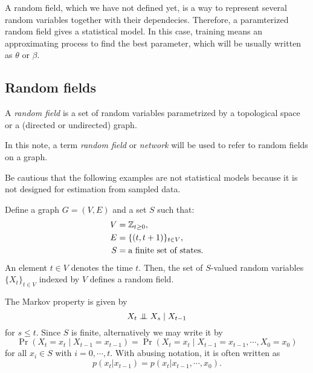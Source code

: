 \documentclass{../exp}
\begin{document}
\begin{ex}
A random field, which we have not defined yet, is a way to represent several random variables together with their dependecies.
Therefore, a paramterized random field gives a statistical model.
In this case, training means an approximating process to find the best parameter, which will be usually written as $\theta$ or $\beta$.
\end{ex}

\subsection{Random fields}
\begin{defn}
A \emph{random field} is a set of random variables parametrized by a topological space or a (directed or undirected) graph.
\end{defn}
\begin{defn}
In this note, a term \emph{random field} or \emph{network} will be used to refer to random fields on a graph.
\end{defn}

Be cautious that the following examples are not statistical models because it is not designed for estimation from sampled data.
\begin{ex}
Define a graph $G=(V,E)$ and a set $S$ such that:
\begin{align*}
V&=\mathbb{Z}_{t\ge0},\\
E&=\{(t,t+1)\}_{t\in V},\\
S&=\text{a finite set of states}.
\end{align*}
An element $t\in V$ denotes the time $t$.
Then, the set of $S$-valued random variables $\{X_t\}_{t\in V}$ indexed by $V$ defines a random field.

The Markov property is given by
\[X_t\mathrel{\perp\mspace{-10mu}\perp} X_s\mid X_{t-1}\]
for $s\le t$.
Since $S$ is finite, alternatively we may write it by
\[\Pr(X_t=x_t\mid X_{t-1}=x_{t-1})=\Pr(X_t=x_t\mid X_{t-1}=x_{t-1},\cdots,X_0=x_0)\]
for all $x_i\in S$ with $i=0,\cdots,t$.
With abusing notation, it is often written as
\[p(x_t|x_{t-1})=p(x_t|x_{t-1},\cdots,x_0).\]
\end{ex}
\end{document}
